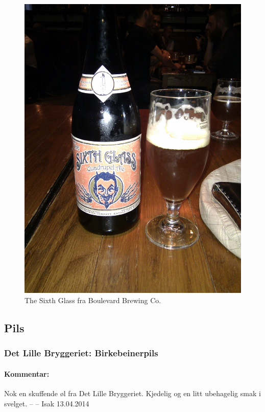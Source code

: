 \documentclass[12pt,a4paper,oneside,norsk]{article}
\begin{document}
\begin{figure} [H]
\centering
\includegraphics[scale=0.1, angle=0]{Bilder/Ol/Thesixth}
\caption{The Sixth Glass fra Boulevard Brewing Co.}
\end{figure}

\newpage
\subsection{Pils}

\subsubsection{Det Lille Bryggeriet: Birkebeinerpils}
\paragraph{Kommentar:}Nok en skuffende øl fra Det Lille Bryggeriet. Kjedelig og en litt ubehagelig smak i svelget. 
\newline
-- -- Isak 13.04.2014
\end{document}
